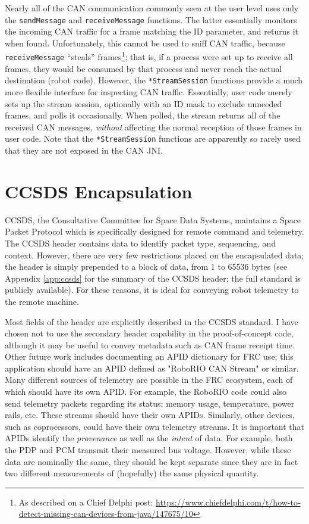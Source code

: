 \documentclass[12pt]{article}
\begin{document}
\par Nearly all of the CAN communication commonly seen at the user level uses only the \texttt{sendMessage} and \texttt{receiveMessage} functions. The latter essentially monitors the incoming CAN traffic for a frame matching the ID parameter, and returns it when found. Unfortunately, this cannot be used to sniff CAN traffic, because \texttt{receiveMessage} ``steals'' frames\footnote{As described on a Chief Delphi post: \href{https://www.chiefdelphi.com/t/how-to-detect-missing-can-devices-from-java/147675/10}{https://www.chiefdelphi.com/t/how-to-detect-missing-can-devices-from-java/147675/10}}; that is, if a process were set up to receive all frames, they would be consumed by that process and never reach the actual destination (robot code). However, the \texttt{*StreamSession} functions provide a much more flexible interface for inspecting CAN traffic. Essentially, user code merely sets up the stream session, optionally with an ID mask to exclude unneeded frames, and polls it occasionally. When polled, the stream returns all of the received CAN messages, \textit{without} affecting the normal reception of those frames in user code. Note that the \texttt{*StreamSession} functions are apparently so rarely used that they are not exposed in the CAN JNI. 

\section{CCSDS Encapsulation}
\par CCSDS, the Consultative Committee for Space Data Systems, maintains a Space Packet Protocol which is specifically designed for remote command and telemetry. The CCSDS header contains data to identify packet type, sequencing, and context. However, there are very few restrictions placed on the encapsulated data; the header is simply prepended to a block of data, from 1 to 65536 bytes (see Appendix \ref{app:ccsds} for the summary of the CCSDS header; the full standard is publicly available). For these reasons, it is ideal for conveying robot telemetry to the remote machine.
\par Most fields of the header are explicitly described in the CCSDS standard. I have chosen not to use the secondary header capability in the proof-of-concept code, although it may be useful to convey metadata such as CAN frame receipt time. Other future work includes documenting an APID dictionary for FRC use; this application should have an APID defined as "RoboRIO CAN Stream" or similar. Many different sources of telemetry are possible in the FRC ecosystem, each of which should have its own APID. For example, the RoboRIO code could also send telemetry packets regarding its status: memory usage, temperature, power rails, etc. These streams should have their own APIDs. Similarly, other devices, such as coprocessors, could have their own telemetry streams. It is important that APIDs identify the \textit{provenance} as well as the \textit{intent} of data. For example, both the PDP and PCM transmit their measured bus voltage. However, while these data are nominally the same, they should be kept separate since they are in fact two different measurements of (hopefully) the same physical quantity. 
\end{document}
